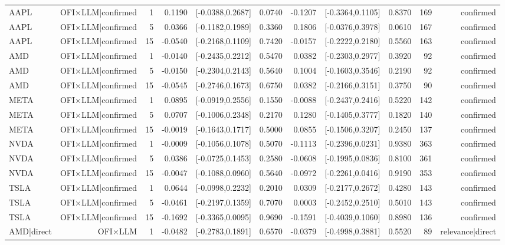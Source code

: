 \begin{table}[htbp]
\begin{tabular}{lrrrrrrrrrr}
AAPL & OFI×LLM|confirmed & 1 & 0.1190 & [-0.0388,0.2687] & 0.0740 & -0.1207 & [-0.3364,0.1105] & 0.8370 & 169 & confirmed \\
AAPL & OFI×LLM|confirmed & 5 & 0.0366 & [-0.1182,0.1989] & 0.3360 & 0.1806 & [-0.0376,0.3978] & 0.0610 & 167 & confirmed \\
AAPL & OFI×LLM|confirmed & 15 & -0.0540 & [-0.2168,0.1109] & 0.7420 & -0.0157 & [-0.2222,0.2180] & 0.5560 & 163 & confirmed \\
AMD & OFI×LLM|confirmed & 1 & -0.0140 & [-0.2435,0.2212] & 0.5470 & 0.0382 & [-0.2303,0.2977] & 0.3920 & 92 & confirmed \\
AMD & OFI×LLM|confirmed & 5 & -0.0150 & [-0.2304,0.2143] & 0.5640 & 0.1004 & [-0.1603,0.3546] & 0.2190 & 92 & confirmed \\
AMD & OFI×LLM|confirmed & 15 & -0.0545 & [-0.2746,0.1673] & 0.6750 & 0.0382 & [-0.2166,0.3151] & 0.3750 & 90 & confirmed \\
META & OFI×LLM|confirmed & 1 & 0.0895 & [-0.0919,0.2556] & 0.1550 & -0.0088 & [-0.2437,0.2416] & 0.5220 & 142 & confirmed \\
META & OFI×LLM|confirmed & 5 & 0.0707 & [-0.1006,0.2348] & 0.2170 & 0.1280 & [-0.1405,0.3777] & 0.1820 & 140 & confirmed \\
META & OFI×LLM|confirmed & 15 & -0.0019 & [-0.1643,0.1717] & 0.5000 & 0.0855 & [-0.1506,0.3207] & 0.2450 & 137 & confirmed \\
NVDA & OFI×LLM|confirmed & 1 & -0.0009 & [-0.1056,0.1078] & 0.5070 & -0.1113 & [-0.2396,0.0231] & 0.9380 & 363 & confirmed \\
NVDA & OFI×LLM|confirmed & 5 & 0.0386 & [-0.0725,0.1453] & 0.2580 & -0.0608 & [-0.1995,0.0836] & 0.8100 & 361 & confirmed \\
NVDA & OFI×LLM|confirmed & 15 & -0.0047 & [-0.1088,0.0960] & 0.5640 & -0.0972 & [-0.2261,0.0416] & 0.9190 & 353 & confirmed \\
TSLA & OFI×LLM|confirmed & 1 & 0.0644 & [-0.0998,0.2232] & 0.2010 & 0.0309 & [-0.2177,0.2672] & 0.4280 & 143 & confirmed \\
TSLA & OFI×LLM|confirmed & 5 & -0.0461 & [-0.2197,0.1359] & 0.7070 & 0.0003 & [-0.2452,0.2510] & 0.5010 & 143 & confirmed \\
TSLA & OFI×LLM|confirmed & 15 & -0.1692 & [-0.3365,0.0095] & 0.9690 & -0.1591 & [-0.4039,0.1060] & 0.8980 & 136 & confirmed \\
AMD|direct & OFI×LLM & 1 & -0.0482 & [-0.2783,0.1891] & 0.6570 & -0.0379 & [-0.4998,0.3881] & 0.5520 & 89 & relevance|direct \\

\end{tabular}
\end{table}
